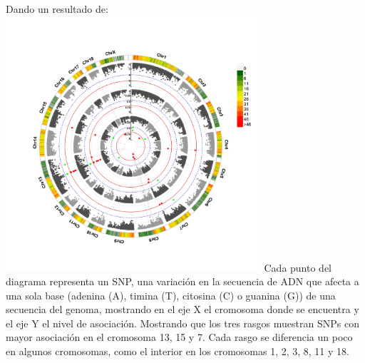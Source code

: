 \documentclass{article}\usepackage[]{graphicx}\usepackage[]{color}
\begin{document}
\clearpage
Dando un resultado de:~\\
\vbox{
    \centering
    \includegraphics[width=0.71\textwidth]{imag/CMplot}
}
Cada punto del diagrama representa un SNP, una variaci\'on en la secuencia de ADN que afecta a una sola base (adenina (A), timina (T), citosina (C) o guanina (G)) de una secuencia del genoma, mostrando en el eje X el cromosoma donde se encuentra y el eje Y el nivel de asociaci\'on. Mostrando que los tres rasgos muestran SNPs con mayor asociaci\'on en el cromosoma 13, 15 y 7. Cada rasgo se diferencia un poco en algunos cromosomas, como el interior en los cromosomas 1, 2, 3, 8, 11 y 18.
\end{document}
